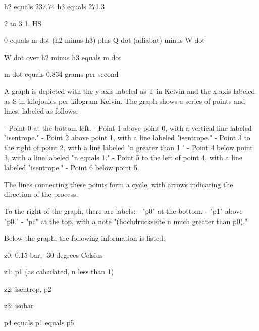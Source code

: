 h2 equals 237.74  
h3 equals 271.3  

2 to 3 1. HS  

0 equals m dot (h2 minus h3) plus Q dot (adiabat) minus W dot  

W dot over h2 minus h3 equals m dot  

m dot equals 0.834 grams per second

A graph is depicted with the y-axis labeled as T in Kelvin and the x-axis labeled as S in kilojoules per kilogram Kelvin. The graph shows a series of points and lines, labeled as follows:

- Point 0 at the bottom left.
- Point 1 above point 0, with a vertical line labeled "isentrope."
- Point 2 above point 1, with a line labeled "isentrope."
- Point 3 to the right of point 2, with a line labeled "n greater than 1."
- Point 4 below point 3, with a line labeled "n equals 1."
- Point 5 to the left of point 4, with a line labeled "isentrope."
- Point 6 below point 5.

The lines connecting these points form a cycle, with arrows indicating the direction of the process.

To the right of the graph, there are labels:
- "p0" at the bottom.
- "p1" above "p0."
- "pc" at the top, with a note "(hochdruckseite n much greater than p0)."

Below the graph, the following information is listed:

z0: 0.15 bar, -30 degrees Celsius

z1: p1 (as calculated, n less than 1)

z2: isentrop, p2

z3: isobar

p4 equals p1 equals p5